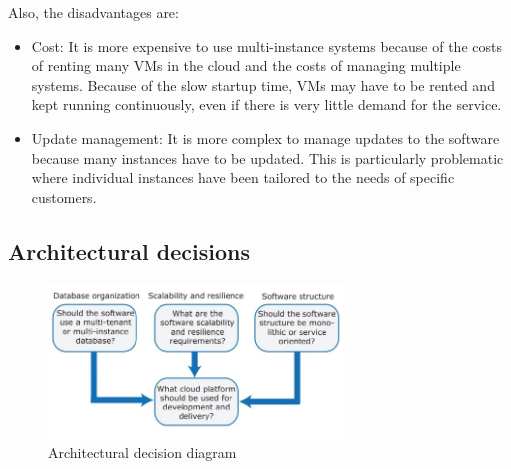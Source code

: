 \documentclass[10pt,a4paper]{report}
\begin{document}
Also, the disadvantages are:
\begin{itemize}
	\item Cost:
	It is more expensive to use multi-instance systems because of the costs of
	renting many VMs in the cloud and the costs of managing multiple systems.
	Because of the slow startup time, VMs may have to be rented and kept running
	continuously, even if there is very little demand for the service.

	
	\item Update management:
	It is more complex to manage updates to the software because many instances
	have to be updated. This is particularly problematic where individual instances
	have been tailored to the needs of specific customers.
	
\end{itemize}

\subsection{Architectural decisions}
   \begin{figure}[h]
	\centering
	\includegraphics[width=0.7\textwidth]{image57}
	\caption{Architectural decision diagram}
	\label{image57}
\end{figure}
\end{document}
